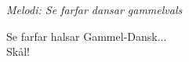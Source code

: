 {\footnotesize\textit{Melodi: Se farfar dansar gammelvals}}\par
\vspace{10pt}
Se farfar halsar Gammel-Dansk...\\
Skål!
